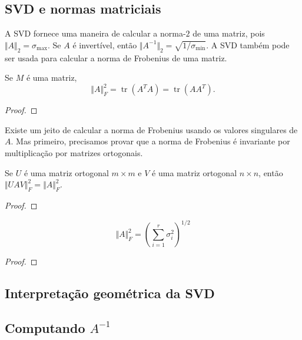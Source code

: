 \documentclass{article}
\DeclareMathOperator{\tr}{tr}
\begin{document}
\subsection{SVD e normas matriciais}

A SVD fornece uma maneira de calcular a norma-\(2\) de uma matriz, pois \(\Vert A \Vert_2 = \sigma_{\max}\). Se \(A\) é invertível, então \(\Vert A^{-1} \Vert_2 = \sqrt{1/\sigma_{\min}}\). A SVD também pode ser usada para calcular a norma de Frobenius de uma matriz.

\begin{prop}
    Se \(M\) é uma matriz,
    \begin{equation}
        \Vert A \Vert_F^2 = \tr(A^T A) = \tr(A A^T).
    \end{equation}
\end{prop}

\begin{proof}
    
\end{proof}

Existe um jeito de calcular a norma de Frobenius usando os valores singulares de \(A\). Mas primeiro, precisamos provar que a norma de Frobenius é invariante por multiplicação por matrizes ortogonais.

\begin{lem}
    Se \(U\) é uma matriz ortogonal \(m \times m\) e \(V\) é uma matriz ortogonal \(n \times n\), então \(\Vert UAV \Vert_F^2 = \Vert A \Vert_F^2\).
\end{lem}

\begin{proof}
    
\end{proof}

\begin{cor}
    \begin{equation}
        \Vert A \Vert_F^2 = \left(\sum_{i=1}^{r} \sigma_i^2\right)^{1/2}
    \end{equation}
\end{cor}

\begin{proof}
    
\end{proof}

\subsection{Interpretação geométrica da SVD}

\subsection{Computando \(A^{-1}\)}
\end{document}
